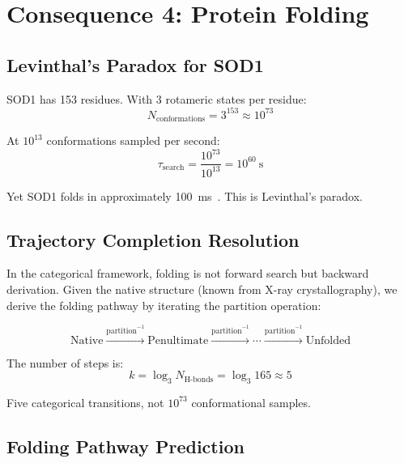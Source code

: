 \documentclass[twocolumn,aps,prx,superscriptaddress,longbibliography]{revtex4-2}
\theoremstyle{remark}
\begin{document}
\section{Consequence 4: Protein Folding}
\label{sec:folding}

\subsection{Levinthal's Paradox for SOD1}

SOD1 has 153 residues. With 3 rotameric states per residue:
\begin{equation}
N_\text{conformations} = 3^{153} \approx 10^{73}
\end{equation}

At $10^{13}$ conformations sampled per second:
\begin{equation}
\tau_\text{search} = \frac{10^{73}}{10^{13}} = 10^{60}~\text{s}
\end{equation}

Yet SOD1 folds in approximately 100~ms~\cite{Lindberg2004}. This is
Levinthal's paradox.

\subsection{Trajectory Completion Resolution}

In the categorical framework, folding is not forward search but backward
derivation. Given the native structure (known from X-ray crystallography),
we derive the folding pathway by iterating the partition operation:

\begin{equation}
\text{Native} \xrightarrow{\text{partition}^{-1}} \text{Penultimate}
\xrightarrow{\text{partition}^{-1}} \cdots \xrightarrow{\text{partition}^{-1}}
\text{Unfolded}
\end{equation}

The number of steps is:
\begin{equation}
k = \log_3 N_\text{H-bonds} = \log_3 165 \approx 5
\end{equation}

Five categorical transitions, not $10^{73}$ conformational samples.

\subsection{Folding Pathway Prediction}
\end{document}
